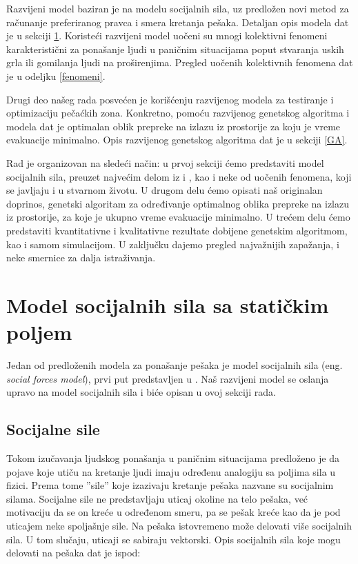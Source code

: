 \documentclass[12pt]{article}
\begin{document}
Razvijeni model baziran je na modelu socijalnih sila, uz predložen novi metod za računanje preferiranog pravca i smera kretanja pešaka. Detaljan opis modela dat je u sekciji \ref{sile}. Koristeći razvijeni model uočeni su mnogi kolektivni fenomeni karakteristični za ponašanje ljudi u paničnim situacijama poput stvaranja uskih grla ili gomilanja ljudi na proširenjima. Pregled uočenih kolektivnih fenomena dat je u odeljku \ref{fenomeni}. 

Drugi deo našeg rada posvećen je korišćenju razvijenog modela za testiranje i optimizaciju pečaćkih zona. Konkretno, pomoću razvijenog genetskog algoritma i modela dat je optimalan oblik prepreke na izlazu iz prostorije za koju je vreme evakuacije minimalno. Opis razvijenog genetskog algoritma dat je u sekciji \ref{GA}. 

Rad je organizovan na sledeći način: u prvoj sekciji ćemo predstaviti model socijalnih sila, preuzet najvećim delom iz \citep{Helbing1998} i \citep{Helbing2002}, kao i neke od uočenih fenomena, koji se javljaju i u stvarnom životu. U drugom delu ćemo opisati naš originalan doprinos, genetski algoritam za određivanje optimalnog oblika prepreke na izlazu iz prostorije, za koje je ukupno vreme evakuacije minimalno. U trećem delu ćemo predstaviti kvantitativne i kvalitativne rezultate dobijene genetskim algoritmom, kao i samom simulacijom. U zaključku dajemo pregled najvažnijih zapažanja, i neke smernice za dalja istraživanja.

\section{Model socijalnih sila sa statičkim poljem}
\label{sile}

Jedan od predloženih modela za ponašanje pešaka je model socijalnih sila (eng. \emph{social forces model}), prvi put predstavljen u \citep{Helbing1994}. Naš razvijeni model se oslanja upravo na model socijalnih sila i biće opisan u ovoj sekciji rada. 

    \subsection{Socijalne sile}

Tokom izučavanja ljudskog ponašanja u paničnim situacijama predloženo je da pojave koje utiču na kretanje ljudi imaju određenu analogiju sa poljima sila u fizici. Prema tome ''sile'' koje izazivaju kretanje pešaka nazvane su socijalnim silama. Socijalne sile ne predstavljaju uticaj okoline na telo pešaka, već motivaciju da se on kreće u određenom smeru, pa se pešak kreće kao da je pod uticajem neke spoljašnje sile. Na pešaka istovremeno može delovati više socijalnih sila. U tom slučaju, uticaji se sabiraju vektorski. Opis socijalnih sila koje mogu delovati na pešaka dat je ispod:
\end{document}
